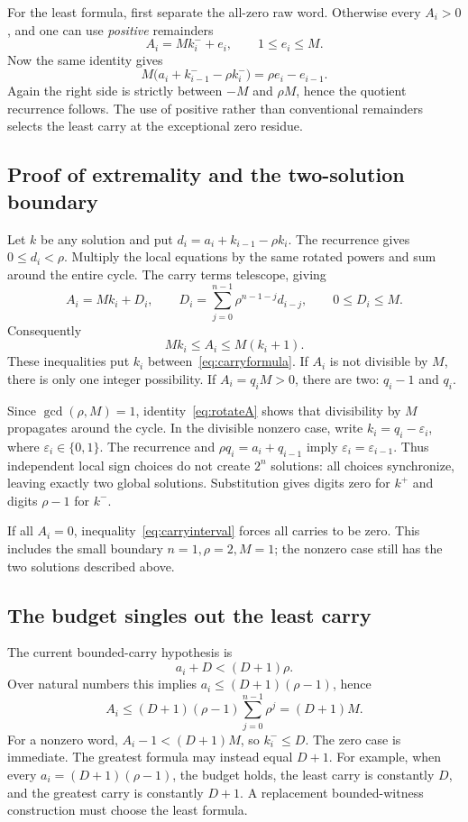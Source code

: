 \documentclass[11pt]{article}
\theoremstyle{remark}\newtheorem{remark}[theorem]{Remark}
\begin{document}
For the least formula, first separate the all-zero raw word. Otherwise every \(A_i>0\), and one can use \emph{positive} remainders
\[
 A_i=M k_i^-+e_i,\qquad 1\le e_i\le M.
\]
Now the same identity gives
\[
 M\bigl(a_i+k_{i-1}^--\rho k_i^-\bigr)=\rho e_i-e_{i-1}.
\]
Again the right side is strictly between \(-M\) and \(\rho M\), hence the quotient recurrence follows. The use of positive rather than conventional remainders selects the least carry at the exceptional zero residue.

\subsection{Proof of extremality and the two-solution boundary}

Let \(k\) be any solution and put \(d_i=a_i+k_{i-1}-\rho k_i\). The recurrence gives \(0\le d_i<\rho\). Multiply the local equations by the same rotated powers and sum around the entire cycle. The carry terms telescope, giving
\[
 A_i=M k_i+D_i,
 \qquad D_i=\sum_{j=0}^{n-1}\rho^{n-1-j}d_{i-j},
 \qquad 0\le D_i\le M.
\]
Consequently
\begin{equation}
 M k_i\le A_i\le M(k_i+1).
 \label{eq:carryinterval}
\end{equation}
These inequalities put \(k_i\) between~\eqref{eq:carryformula}. If \(A_i\) is not divisible by \(M\), there is only one integer possibility. If \(A_i=q_iM>0\), there are two: \(q_i-1\) and \(q_i\).

Since \(\gcd(\rho,M)=1\), identity~\eqref{eq:rotateA} shows that divisibility by \(M\) propagates around the cycle. In the divisible nonzero case, write \(k_i=q_i-\varepsilon_i\), where \(\varepsilon_i\in\{0,1\}\). The recurrence and \(\rho q_i=a_i+q_{i-1}\) imply \(\varepsilon_i=\varepsilon_{i-1}\). Thus independent local sign choices do not create \(2^n\) solutions: all choices synchronize, leaving exactly two global solutions. Substitution gives digits zero for \(k^+\) and digits \(\rho-1\) for \(k^-\).

If all \(A_i=0\), inequality~\eqref{eq:carryinterval} forces all carries to be zero. This includes the small boundary \(n=1,\rho=2,M=1\); the nonzero case still has the two solutions described above.

\subsection{The budget singles out the least carry}

The current bounded-carry hypothesis is
\[
 a_i+D<(D+1)\rho.
\]
Over natural numbers this implies
\(a_i\le(D+1)(\rho-1)\), hence
\[
 A_i\le(D+1)(\rho-1)\sum_{j=0}^{n-1}\rho^j=(D+1)M.
\]
For a nonzero word, \(A_i-1<(D+1)M\), so \(k_i^-\le D\). The zero case is immediate. The greatest formula may instead equal \(D+1\). For example, when every \(a_i=(D+1)(\rho-1)\), the budget holds, the least carry is constantly \(D\), and the greatest carry is constantly \(D+1\). A replacement bounded-witness construction must choose the least formula.
\end{document}
